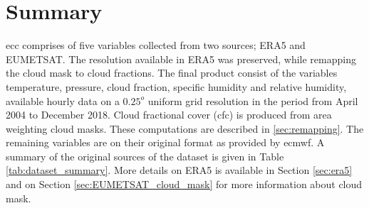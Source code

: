 \section{Summary}
\acrshort{ecc} comprises of five variables collected from two sources; ERA5 and EUMETSAT. The resolution available in ERA5 was preserved, while remapping the cloud mask to cloud fractions. The final product consist of the variables temperature, pressure, cloud fraction, specific humidity and relative humidity, available hourly data on a $0.25^o$ uniform grid resolution in the period from April 2004 to December 2018. Cloud fractional cover (\acrshort{cfc}) is produced from area weighting cloud masks. These computations are described in \ref{sec:remapping}. The remaining variables are on their original format as provided by \acrfull{ecmwf}. A summary of the original sources of the dataset is given in Table \ref{tab:dataset_summary}. More details on ERA5 is available in Section \ref{sec:era5} and on Section \ref{sec:EUMETSAT_cloud_mask} for more information about cloud mask. 



